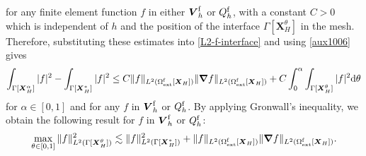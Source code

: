 \documentclass[11pt,reqno]{amsart}
\theoremstyle{definition}
\theoremstyle{plain}
\numberwithin{theorem}{section}
\numberwithin{proposition}{section}
\numberwithin{lemma}{section}
\numberwithin{equation}{section}
\newcommand{\bs}[1]{\boldsymbol{#1}}
\newcommand{\uu}[1]  {{\bs{#1}} }
\newcommand{\grad}   { \uu{\nabla}    }
\def\d{\mathrm{d}}
\renewcommand{\(}{\bigl(}
\renewcommand{\)}{\bigr)}
\begin{document}
for any finite element function $f$ in either ${\bs V}_h^{\rm f}$ or $Q_h^{\rm f}$, with a constant $C>0$ which is independent of $h$ and the position of the interface $\Gamma[\bs X_H^\theta]$ in the mesh. Therefore, substituting these estimates into \eqref{L2-f-interface} and using \eqref{aux1006} gives
$$
\int_{\Gamma[\bs X_H^\alpha]} | f |^2 - \int_{\Gamma[\bs X_H^*]} | f |^2
\le C \|f\|_{L^2(\Omega^{\rm f}_{\rm ext}[\bs X_H])} \|\grad f\|_{L^2(\Omega^{\rm f}_{\rm ext}[\bs X_H])} 
+  C \int_0^\alpha \int_{\Gamma[\bs X_H^\theta]} | f |^2\d\theta
$$
for $\alpha\in[0,1]$ and for any $f$ in ${\bs V}_h^{\rm f}$ or $Q_h^{\rm f}$.
By applying Gronwall's inequality, we obtain the following result for $f$ in ${\bs V}_h^{\rm f}$ or $Q_h^{\rm f}$:   
\begin{align}\label{L2-f-trace-1}
\begin{aligned}
\max_{\theta\in[0,1]} \| f \|_{L^2(\Gamma[\bs X_H^\theta])}^2
\lesssim \| f \|_{L^2(\Gamma[\bs X_H^*])}^2 + \|f\|_{L^2(\Omega^{\rm f}_{\rm ext}[\bs X_H])} \|\grad f\|_{L^2(\Omega^{\rm f}_{\rm ext}[\bs X_H])} . 
\end{aligned}
\end{align}
\end{document}
